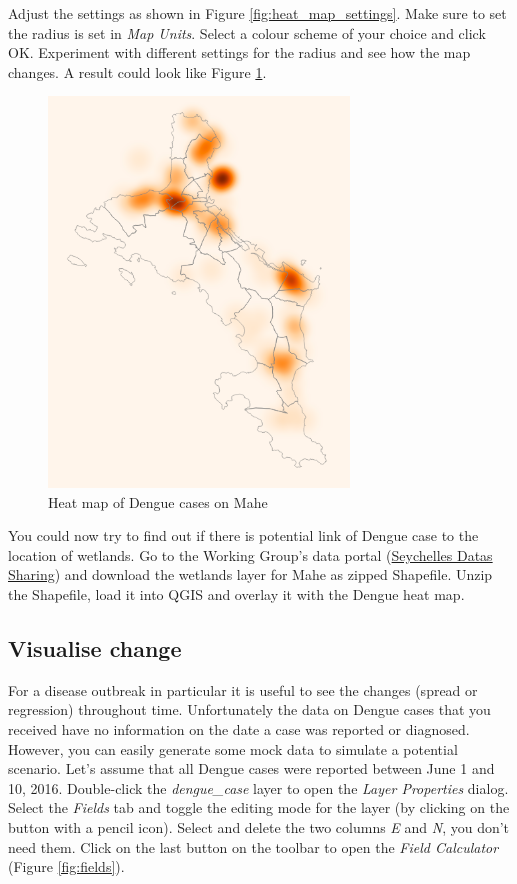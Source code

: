\documentclass[a4paper,12pt,titlepage]{article}
\begin{document}
Adjust the settings as shown in Figure \ref{fig:heat_map_settings}. Make sure to set the radius is set in \textit{Map Units}. Select a colour scheme of your choice and click OK.
Experiment with different settings for the radius and see how the map changes. A result could look like Figure \ref{fig:mahe_heat_map}.

\begin{figure}[htb]
	\centering
	\includegraphics[width=8cm]{Images/mahe_heat_map.png}
	\caption{Heat map of Dengue cases on Mahe}\label{fig:mahe_heat_map}
\end{figure}

You could now try to find out if there is potential link of Dengue case to the location of wetlands. Go to the Working Group's data portal (\href{http://178.63.85.21}{Seychelles Datas Sharing}) and download the wetlands layer for Mahe as zipped Shapefile. Unzip the Shapefile, load it into QGIS and overlay it with the Dengue heat map. 

\subsection{Visualise change}

For a disease outbreak in particular it is useful to see the changes (spread or regression) throughout time. Unfortunately the data on Dengue cases that you received have no information on the date a case was reported or diagnosed. However, you can easily generate some mock data to simulate a potential scenario. Let's assume that all Dengue cases were reported between June 1 and 10, 2016. Double-click the \textit{dengue\_case} layer to open the \textit{Layer Properties} dialog. Select the \textit{Fields} tab and toggle the editing mode for the layer (by clicking on the button with a pencil icon). Select and delete the two columns \textit{E} and \textit{N}, you don't need them. Click on the last button on the toolbar to open the \textit{Field Calculator} (Figure \ref{fig:fields}). 
\end{document}
